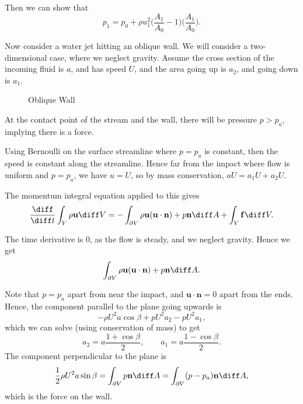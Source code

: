 \documentclass[12pt]{article}
\begin{document}
Then we can show that
\[
p_1 = p_0 + \rho u_1^2 \biggl( \frac{A_1}{A_0} - 1 \biggr) \biggl( \frac{A_1}{A_0} \biggr)
.\]

Now consider a water jet hitting an oblique wall. We will consider a two-dimensional case, where we neglect gravity. Assume the cross section of the incoming fluid is $a$, and has speed $U$, and the area going up is $a_2$, and going down is $a_1$.

\begin{figure}[h]
	\centering%
	\caption{Oblique Wall}
	\label{fig:oblique_wall}
\end{figure}

At the contact point of the stream and the wall, there will be pressure $p > p_a$, implying there is a force.

Using Bernoulli on the surface streamline where $p = p_a$ is constant, then the speed is constant along the streamline. Hence far from the impact where flow is uniform and $p = p_a$, we have $u = U$, so by mass conservation, $aU = a_1U + a_2U$.

The momentum integral equation applied to this gives
\[
\frac{\diff}{\diff t} \int_{V} \rho \mathbf{u} \diff V = - \int_{\partial V} \rho \mathbf{u} (\mathbf{u} \cdot \mathbf{n}) + p \mathbf{n} \diff A + \int_{V} \mathbf{f} \diff V
.\]

The time derivative is 0, as the flow is steady, and we neglect gravity. Hence we get
\[
\int_{\partial V} \rho \mathbf{u} (\mathbf{u} \cdot \mathbf{n}) + p \mathbf{n} \diff A
.\]

Note that $p = p_a$ apart from near the impact, and $\mathbf{u} \cdot \mathbf{n} = 0$ apart from the ends. Hence, the component parallel to the plane going upwards is
\[
-\rho U^2 a \cos \beta + p U^2 a_2 - p U^2 a_1
,\]
which we can solve (using conservation of mass) to get
\[
a_2 = a \frac{1 + \cos \beta}{2}, \qquad a_1 = a \frac{1 - \cos \beta}{2}
.\]
The component perpendicular to the plane is
\[
\frac{1}{2} \rho U^2 a \sin \beta = \int_{\partial V} p \mathbf{n} \diff A = \int_{\partial V} (p - p_a)\mathbf{n} \diff A
,\]
which is the force on the wall.
\end{document}
